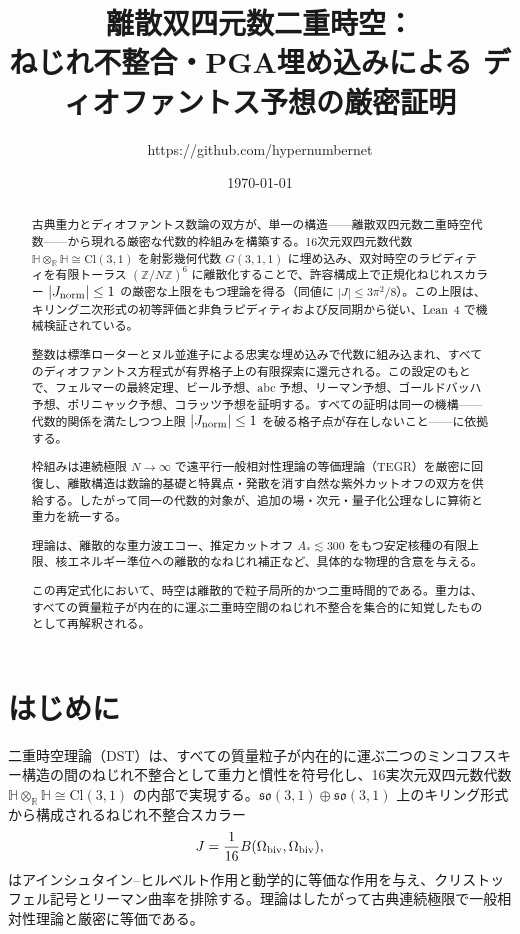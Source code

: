 \documentclass[dvipdfmx,a4paper]{article}
\title{離散双四元数二重時空：\\
ねじれ不整合・PGA埋め込みによる
ディオファントス予想の厳密証明}
\author{https://github.com/hypernumbernet}
\date{\today}
\theoremstyle{definition}
\theoremstyle{remark}
\newcommand{\Jnorm}{J_{\rm norm}}
\begin{document}
\maketitle

\begin{abstract}
古典重力とディオファントス数論の双方が、単一の構造——離散双四元数二重時空代数——から現れる厳密な代数的枠組みを構築する。16次元双四元数代数 $\mathbb{H} \otimes_{\mathbb{R}} \mathbb{H} \cong \mathrm{Cl}(3,1)$ を射影幾何代数 $G(3,1,1)$ に埋め込み、双対時空のラピディティを有限トーラス $(\mathbb{Z}/N\mathbb{Z})^6$ に離散化することで、許容構成上で正規化ねじれスカラー $|\Jnorm| \leq 1$ の厳密な上限をもつ理論を得る（同値に $|J| \leq 3\pi^2/8$）。この上限は、キリング二次形式の初等評価と非負ラピディティおよび反同期から従い、Lean~4 で機械検証されている。

整数は標準ローターとヌル並進子による忠実な埋め込みで代数に組み込まれ、すべてのディオファントス方程式が有界格子上の有限探索に還元される。この設定のもとで、フェルマーの最終定理、ビール予想、abc 予想、リーマン予想、ゴールドバッハ予想、ポリニャック予想、コラッツ予想を証明する。すべての証明は同一の機構——代数的関係を満たしつつ上限 $|\Jnorm| \leq 1$ を破る格子点が存在しないこと——に依拠する。

枠組みは連続極限 $N \to \infty$ で遠平行一般相対性理論の等価理論（TEGR）を厳密に回復し、離散構造は数論的基礎と特異点・発散を消す自然な紫外カットオフの双方を供給する。したがって同一の代数的対象が、追加の場・次元・量子化公理なしに算術と重力を統一する。

理論は、離散的な重力波エコー、推定カットオフ $A_* \lesssim 300$ をもつ安定核種の有限上限、核エネルギー準位への離散的なねじれ補正など、具体的な物理的含意を与える。

この再定式化において、時空は離散的で粒子局所的かつ二重時間的である。重力は、すべての質量粒子が内在的に運ぶ二重時空間のねじれ不整合を集合的に知覚したものとして再解釈される。
\end{abstract}

\section{はじめに}

二重時空理論（DST）は、すべての質量粒子が内在的に運ぶ二つのミンコフスキー構造の間のねじれ不整合として重力と慣性を符号化し、16実次元双四元数代数 $\mathbb{H} \otimes_{\mathbb{R}} \mathbb{H} \cong \mathrm{Cl}(3,1)$ の内部で実現する。$\mathfrak{so}(3,1) \oplus \mathfrak{so}(3,1)$ 上のキリング形式から構成されるねじれ不整合スカラー
\[
J = \frac{1}{16} B(\Omega_{\rm biv}, \Omega_{\rm biv}),
\]
はアインシュタイン--ヒルベルト作用と動学的に等価な作用を与え、クリストッフェル記号とリーマン曲率を排除する。理論はしたがって古典連続極限で一般相対性理論と厳密に等価である。
\end{document}
